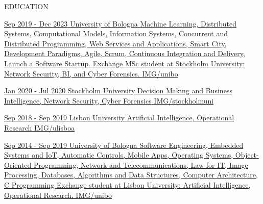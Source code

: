 \documentclass[paper=a4,fontsize=11pt, hidelinks]{temp} %
\makeatletter
\renewcommand{\NewPart}[1]{%
  \par\addvspace{3.5ex \@plus 1ex \@minus .2ex}%
  {\noindent\usefont{OT1}{phv}{b}{n}\Large\color{headings}%
   \MakeUppercase{#1}\hfill\makebox[0pt][r]{\rule[-5pt]{\hsize}{3pt}}\par}%
  \nobreak\vspace{2.3ex \@plus .2ex}\@afterheading}
\makeatother
\begin{document}
\NewPart{Education}{}
\noindent

\href{https://corsi.unibo.it/2cycle/ComputerScienceEngineering}{
{Sep 2019 - Dec 2023}
{University of Bologna}
{
     {%
    Machine Learning, Distributed Systems, Computational Models, Information Systems, Concurrent and Distributed Programming, Web Services and Applications, Smart City, Development Paradigms, Agile, Scrum, Continuous Integration and Delivery, Launch a Software Startup. 
    }{
    Exchange MSc student at Stockholm University: Network Security, BI, and Cyber Forensics.
    }
} 
{IMG/unibo}
}
\sepspace

 {%
\href{https://dsv.su.se/en/}{
{Jan 2020 - Jul 2020}
{Stockholm University}
{Decision Making and Business Intelligence, Network Security, Cyber Forensics}
{IMG/stockholmuni}
}
\sepspace

\href{https://ciencias.ulisboa.pt/en}{
{Sep 2018 - Sep 2019}
{Lisbon University}
{Artificial Intelligence, Operational Research} 
{IMG/ulisboa}
}
\sepspace
}


\href{https://corsi.unibo.it/1cycle/ComputerScienceEngineering}{
{Sep 2014 - Sep 2019}
{University of Bologna}
{
     {%
    Software Engineering, Embedded Systems and IoT, Automatic Controls, Mobile Apps, Operating Systems, Object-Oriented Programming, Network and Telecommunications, Law for IT, Image Processing, Databases, Algorithms and Data Structures, Computer Architecture, C Programming
    }{
    Exchange student at Lisbon University: Artificial Intelligence, Operational Research.
    }
} 
{IMG/unibo}
}
\end{document}
